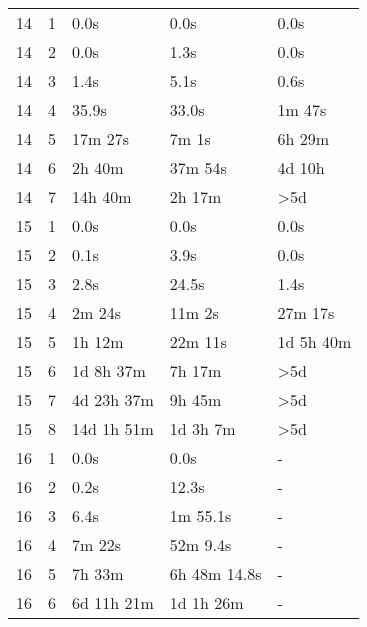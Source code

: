 \documentclass[twoside,leqno,twocolumn]{article}
\begin{document}
\begin{table}[!t]
\begin{tabular}{c|c|l|l|l}
    \hline
    14  & 1   & 0.0s             & 0.0s              & 0.0s             \\
    14  & 2   & 0.0s             & 1.3s              & 0.0s             \\
    14  & 3   & 1.4s             & 5.1s              & 0.6s             \\
    14  & 4   & 35.9s            & 33.0s             & 1m 47s           \\
    14  & 5   & 17m 27s          & 7m 1s             & 6h 29m           \\
    14  & 6   & 2h 40m           & 37m 54s           & 4d 10h           \\
    14  & 7   & 14h 40m          & 2h 17m            & >5d              \\
    \hline
    15  & 1   & 0.0s             & 0.0s              & 0.0s             \\
    15  & 2   & 0.1s             & 3.9s              & 0.0s             \\
    15  & 3   & 2.8s             & 24.5s             & 1.4s             \\
    15  & 4   & 2m 24s           & 11m 2s            & 27m 17s          \\
    15  & 5   & 1h 12m           & 22m 11s           & 1d 5h 40m        \\
    15  & 6   & 1d 8h 37m        & 7h 17m            & >5d              \\
    15  & 7   & 4d 23h 37m       & 9h 45m            & >5d              \\
    15  & 8   & 14d 1h 51m       & 1d 3h 7m          & >5d              \\
    \hline
    16  & 1   & 0.0s             & 0.0s              & -                \\
    16  & 2   & 0.2s             & 12.3s             & -                \\
    16  & 3   & 6.4s             & 1m 55.1s          & -                \\
    16  & 4   & 7m 22s           & 52m 9.4s          & -                \\
    16  & 5   & 7h 33m           & 6h 48m 14.8s      & -                \\
    16  & 6   & 6d 11h 21m       & 1d 1h 26m         & -                \\
  \end{tabular}
\end{table}
\end{document}
